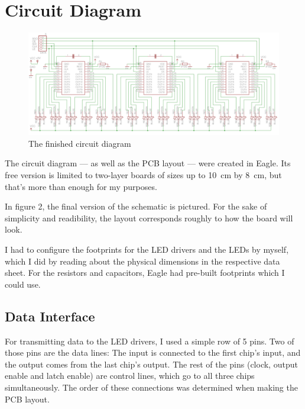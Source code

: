 \documentclass[a4paper, 11pt, titlepage]{report}
\begin{document}
\newpage
\section{Circuit Diagram}

\begin{figure}[h]
\vspace{4mm}
\includegraphics[width=\textwidth]{./images/schematic.png}
\vspace{-8mm}
\caption{The finished circuit diagram}
\vspace{6mm}
\end{figure}

The circuit diagram --- as well as the PCB layout --- were created in Eagle. Its free version is
limited to two-layer boards of sizes up to \SI{10}{\centi\meter} by \SI{8}{\centi\meter}, but
that's more than enough for my purposes.

In figure 2, the final version of the schematic is pictured. For the sake of simplicity and 
readibility, the layout corresponds roughly to how the board will look.

I had to configure the footprints for the LED drivers and the LEDs by myself, which I did by
reading about the physical dimensions in the respective data sheet. For the resistors and 
capacitors, Eagle had pre-built footprints which I could use.

\subsection{Data Interface}

For transmitting data to the LED drivers, I used a simple row of 5 pins. Two of those pins are the
data lines: The input is connected to the first chip's input, and the output comes from the last
chip's output. The rest of the pins (clock, output enable and latch enable) are control lines,
which go to all three chips simultaneously. The order of these connections was determined when 
making the PCB layout.
\end{document}
